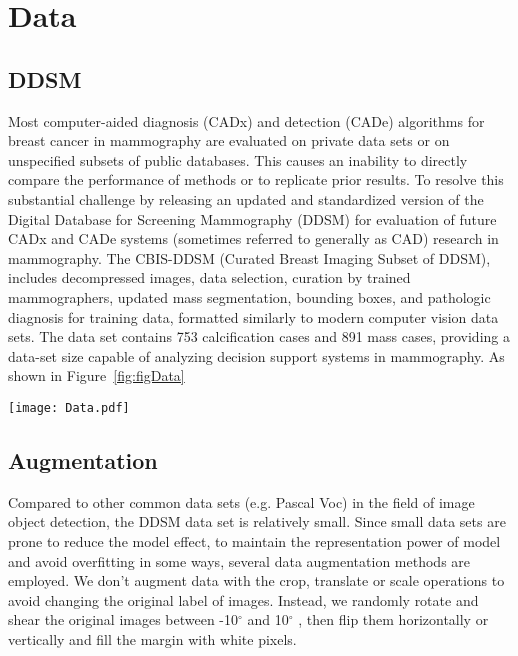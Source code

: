 \section{Data}
\label{sec:Data}

\subsection{DDSM}
\label{subsec: Date_DDSM}

Most computer-aided diagnosis (CADx) and 
detection (CADe) algorithms for breast cancer 
in mammography are evaluated on private data 
sets or on unspecified subsets of public 
databases. 
\cite{Gao2019}
This causes an inability to 
directly compare the performance of methods or 
to replicate prior results. 
\cite{Choukroun2017}
To resolve this substantial challenge by releasing 
an updated and standardized version of the 
Digital Database for Screening Mammography 
(DDSM) for evaluation of future CADx and CADe 
systems (sometimes referred to generally as CAD) 
research in mammography.
\cite{Zhu2017}
The CBIS-DDSM (Curated Breast Imaging Subset of 
DDSM), includes decompressed images, data 
selection, curation by trained mammographers, 
updated mass segmentation, bounding 
boxes, and pathologic diagnosis for training 
data, formatted similarly to modern computer 
vision data sets. The data set contains 753 
calcification cases and 891 mass cases, 
providing a data-set size capable of 
analyzing decision support systems in 
mammography. As shown in Figure~\ref{fig:figData}

\begin{figure*}[!ht]
    \centering
    \texttt{[image: Data.pdf]}
    \caption{Examples in the dataset}
    \label{fig:figData}
\end{figure*}

\subsection{Augmentation}
\label{subsec: Date_Aug}

Compared to other common data sets 
(e.g. Pascal Voc) in the field of image 
object detection, the DDSM data set 
is relatively small. 
\cite{M.HeathK.BowyerD.Kopans2001}
Since small data 
sets are prone to reduce the model effect, 
to maintain the representation power of 
model and avoid overfitting in some ways, 
several data augmentation methods are 
employed. We don’t augment data with the
crop, translate or scale operations to 
avoid changing the original label of images.
Instead, we randomly rotate and shear the 
original images between -10$^{\circ}$ and 
10$^{\circ}$ , then flip them horizontally 
or vertically and fill the margin with 
white pixels. 